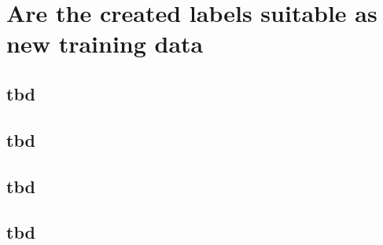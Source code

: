 
\section{Are the created labels suitable as new training data}\label{ord:ch5:sec5}


\subsection{tbd}\label{ord:ch5:sec5:subsec1}

\subsection{tbd}\label{ord:ch5:sec5:subsec2}

\subsection{tbd}\label{ord:ch5:sec5:subsec3}

\subsection{tbd}\label{ord:ch5:sec5:subsec4}
